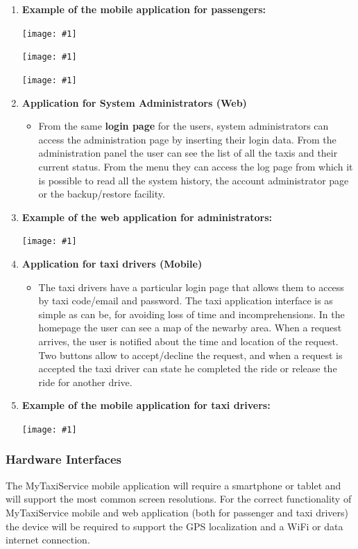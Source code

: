 \documentclass[11pt, a4paper,titlepage]{article}
\newcommand{\productname}{MyTaxiService }
\newcommand{\image}[1]{
	\begin{center}
		\noindent \texttt{[image: \#1]}
	\end{center}
	}
\begin{document}
\begin{enumerate}
\begin{itemize}
\begin{description}
		\end{description}
	\end{itemize}
	\pagebreak
	\item \textbf{Example of the mobile application for passengers: } \newline
	\image{gui_passenger_login.png}
	\image{gui_passenger_home.png}
	\image{gui_passenger_confirmation.png}
	\item \textbf{Application for System Administrators (Web)}
		\begin{itemize}
			\item From the same \textbf{login page} for the users, system administrators can access the administration page by inserting their login data. \newline
			From the administration panel the user can see the list of all the taxis and their current status.
			From the menu they can access the log page from which it is possible to read all the system history, the account administrator page or the backup/restore facility.
		\end{itemize}
		\pagebreak
		\item \textbf{Example of the web application for administrators: } \newline
		\image{gui_admin.png}
	
	\item \textbf{Application for taxi drivers (Mobile)}
		\begin{itemize}
			\item The taxi drivers have a particular login page that allows them to access by taxi code/email and password. \newline The taxi application interface is as simple as can be, for avoiding loss of time and incomprehensions.
			In the homepage the user can see a map of the newarby area. When a request arrives, the user is notified about the time and location of the request. Two buttons allow to accept/decline the request, and when a request is accepted the taxi driver can state he completed the ride or release the ride for another drive.
		\end{itemize}
		\item \textbf{Example of the mobile application for taxi drivers: } \newline
		\image{gui_driver.png}
	
\end{enumerate}

\subsubsection{Hardware Interfaces}
The \productname mobile application will require a smartphone or tablet and will support the most common screen resolutions. \newline
For the correct functionality of \productname mobile and web application (both for passenger and taxi drivers) the device will be required to support the GPS localization and a WiFi or data internet connection. 
\end{document}
